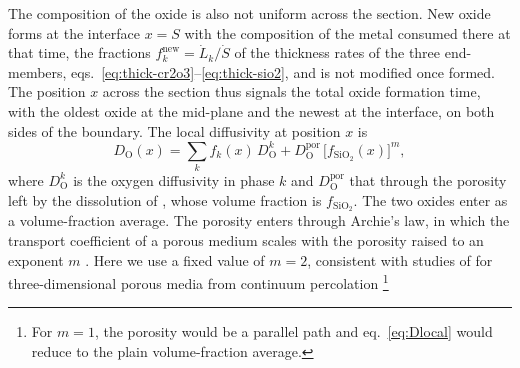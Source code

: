 \documentclass[3p,times]{elsarticle} %
\newcommand{\Ox}{\mathrm{O}}           %
\begin{document}
The composition of the oxide is also not uniform across the section. New oxide
forms at the interface \(x=S\) with the composition of the metal consumed
there at that time, the fractions \(f_k^{\mathrm{new}}=\dot{L}_k/\dot{S}\) of
the thickness rates of the three end-members, eqs.~\eqref{eq:thick-cr2o3}--\eqref{eq:thick-sio2},
and is not modified once formed. The position \(x\) across the section thus signals the total oxide formation time, with the oldest oxide at the
mid-plane and the newest at the interface, on both sides of the boundary.
The local diffusivity at position \(x\) is
\begin{equation}
D_{\Ox}(x)=%
\sum_k f_k(x)\,D_{\Ox}^{k}
          +D_{\Ox}^{\mathrm{por}}\,\bigl[f_{\mathrm{SiO_2}}(x)\bigr]^{m},
\label{eq:Dlocal}
\end{equation}
where \(D_{\Ox}^{k}\) is the oxygen diffusivity in phase \(k\) and
\(D_{\Ox}^{\mathrm{por}}\) that through the porosity left by the dissolution of
, whose volume fraction is \(f_{\mathrm{SiO_2}}\). The two oxides
enter as a volume-fraction average. The porosity enters through Archie's
law, in which the transport coefficient of a porous medium scales with the
porosity raised to an exponent \(m\)
\cite{hunt2004continuum,balberg1986excludedvolume}.
Here we use a fixed value of $m=2$, consistent with studies of 
for three-dimensional porous media from continuum percolation
\cite{hunt2004continuum,balberg1986excludedvolume}\footnote{For
\(m=1\), the porosity would be a parallel path and eq.~\eqref{eq:Dlocal}
would reduce to the plain volume-fraction average.}
\end{document}
